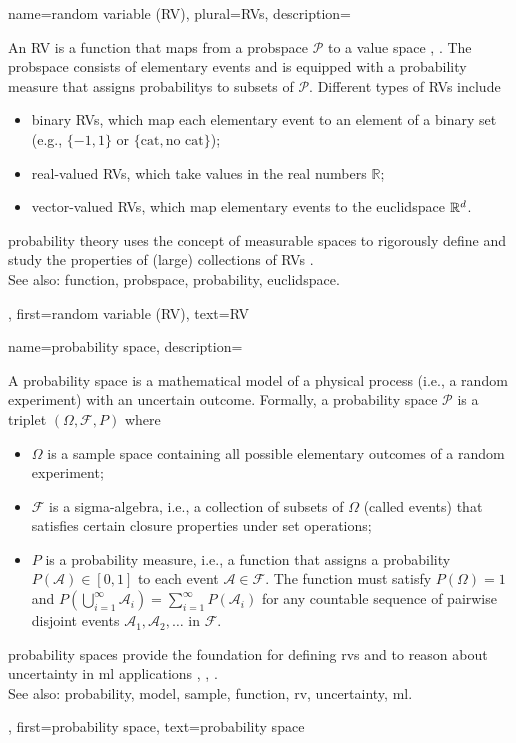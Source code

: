 {name={random variable (RV)}, plural={RVs},
 	description={An RV is a \gls{function} that maps from 
 		a \gls{probspace} $\mathcal{P}$ to a value space \cite{BillingsleyProbMeasure}, \cite{GrayProbBook}. 
 		The \gls{probspace} consists of elementary events and is equipped with a \gls{probability} 
 		measure that assigns \glspl{probability} to subsets of $\mathcal{P}$. 
 		Different types of RVs include  
 		\begin{itemize} 
 			\item {binary RVs}, which map each elementary event to an element of a binary set (e.g., $\{-1,1\}$ or $\{\text{cat}, \text{no cat}\}$); 
 			\item {real-valued RVs}, which take values in the real numbers $\mathbb{R}$;  
 			\item {vector-valued RVs}, which map elementary events to the \gls{euclidspace} $\mathbb{R}^{d}$.  
 		\end{itemize} 
 		\Gls{probability} theory uses the concept of measurable spaces to rigorously define 
 		and study the properties of (large) collections of RVs \cite{BillingsleyProbMeasure}.
			\\
		See also: \gls{function}, \gls{probspace}, \gls{probability}, \gls{euclidspace}.}, 
	first={random variable (RV)},
	text={RV}  
}
 
 {name={probability space}, 
 	description={A \gls{probability} space is a mathematical 
 		\gls{model} of a physical process (i.e., a random experiment) with an uncertain outcome. 
 	   	Formally, a \gls{probability} space $\mathcal{P}$ is a triplet $(\Omega, \mathcal{F}, P)$ where
 		\begin{itemize} 
 		\item  $\Omega$ is a \gls{sample} space containing all possible elementary outcomes of a random experiment;
 		\item  $\mathcal{F}$ is a sigma-algebra, i.e., a collection of subsets of $\Omega$ (called events) that satisfies 
 		certain closure properties under set operations;
 		\item $P$ is a \gls{probability} measure, i.e., a \gls{function} that assigns a \gls{probability} $P(\mathcal{A}) \in [0,1]$ 
 		to each event $\mathcal{A} \in \mathcal{F}$. The \gls{function} must satisfy $P(\Omega) = 1$ and 	$
 		P\left(\bigcup_{i=1}^{\infty} \mathcal{A}_i\right) = \sum_{i=1}^{\infty} P(\mathcal{A}_i)$ for any 
 		countable sequence of pairwise disjoint events $\mathcal{A}_1, \mathcal{A}_2, \ldots$ in $\mathcal{F}$.
 		\end{itemize}
 		\Gls{probability} spaces provide the foundation for defining \glspl{rv} and to reason about 
 		\gls{uncertainty} in \gls{ml} applications \cite{BillingsleyProbMeasure}, \cite{GrayProbBook}, \cite{ross2013first}.
				\\
		See also: \gls{probability}, \gls{model}, \gls{sample}, \gls{function}, \gls{rv}, \gls{uncertainty}, \gls{ml}.},  
 	first={probability space}, 
 	text={probability space}
 }
 
